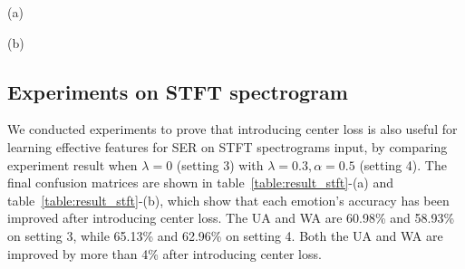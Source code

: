 \documentclass{article}
\begin{document}
\begin{table} [!htp]
	\caption{confusion matrix on, (a) setting 3, (b) setting 4}
	\label{table:result_stft}
	\begin{minipage}[b]{.48\linewidth}
		
		\centerline{
			}
				\vspace{0.5mm}	
				\centerline{(a)  }\medskip
	\end{minipage}
			\hfill
	\begin{minipage}[b]{0.48\linewidth}
				\centerline{
					}
						\vspace{0.5mm}
						\centerline{(b)}\medskip
	\end{minipage}
	
\end{table}				
				
\subsection{Experiments on STFT spectrogram}
We conducted experiments to prove that introducing center loss is also useful for learning effective features for SER on STFT spectrograms input, by comparing experiment result when $\lambda=0$ ({setting 3}) with $\lambda=0.3, \alpha=0.5$ ({setting 4}). The final confusion matrices are shown in table~\ref{table:result_stft}-(a) and table~\ref{table:result_stft}-(b), which show that each emotion's accuracy has been improved after introducing center loss. The UA and WA are 60.98\% and 58.93\% on setting 3, while 65.13\% and 62.96\% on setting 4. Both the UA and WA are improved by more than 4\% after introducing center loss.
\end{document}
